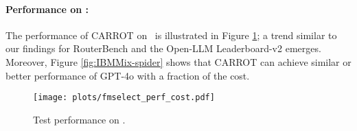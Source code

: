 
\paragraph{Performance on \newdata:} The performance of CARROT on \newdata\ is illustrated in Figure \ref{fig:ROOT In Distribution}; a trend similar to our findings for RouterBench and the Open-LLM Leaderboard-v2 emerges. Moreover, Figure \ref{fig:IBMMix-spider} shows that CARROT can achieve similar or better performance of {GPT-4o} with a fraction of the cost. 
\begin{figure}
    \centering
\texttt{[image: plots/fmselect\_perf\_cost.pdf]}

\vspace{-0.3cm}
    \caption{Test performance on \newdata.}
    \label{fig:ROOT In Distribution}
\end{figure}







